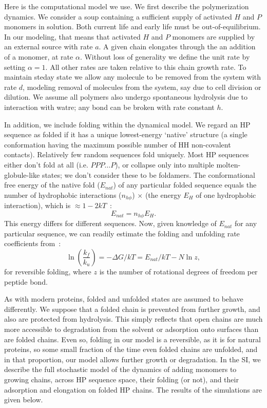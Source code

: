 \documentclass[journal=jacsat,manuscript=article,layout=twocolumn]{achemso}
\newcommand*{\ga}{\alpha}
\newcommand*{\gD}{\Delta}
\newcommand*{\pt}[1]{\left( #1\right)}
\begin{document}
 Here is the computational model we use.  We first describe the polymerization dynamics.  We 
consider a soup containing a sufficient supply of activated $H$ and $P$ monomers in solution.  Both 
current life and early life must be out-of-equilibrium.  In our modeling, that means that activated 
$H$ and $P$ monomers are supplied by an external source with rate $a$.  A given chain elongates 
through the an addition of a monomer, at rate $\ga$. Without loss of generality we define the unit 
rate by setting $\ga = 1$.  All other rates are taken relative to this chain growth rate.  To 
maintain steday state we allow any
molecule to be removed from the system with rate $d$, modeling removal of molecules from the system, 
say due to cell division or dilution.  We assume 
all polymers also undergo spontaneous hydrolysis due to interaction with watre; any bond can be 
broken with rate constant $h$.  


 In addition, we include folding within the dynamical model.  We regard an HP sequence as folded if 
it has a unique lowest-energy `native' structure (a single conformation having the maximum possible 
number of HH non-covalent contacts).  Relatively few random sequences fold uniquely.  Most HP 
sequences either don't fold at all (i.e. $PPP \ldots P$), or collapse only into multiple 
molten-globule-like states; we don't consider these to be foldamers.   
The conformational free energy of the native fold ($E_{nat}$) of any particular folded sequence 
equals 
the number of hydrophobic interactions ($n_{h\phi}$) $\times$ (the energy $E_H$ of one hydrophobic 
interaction), which is $\approx 1-2kT$~\cite{Ghosh2009}:
\begin{equation}
 E_{nat}=n_{h\phi}E_H.
\end{equation} 
This energy differs for different sequences.  Now, given knowledge of $E_{nat}$ for any particular 
sequence, we can readily estimate the folding and unfolding rate coefficients from~\cite{Ghosh2009}:
\begin{equation}
 \ln\pt{\frac{k_f}{k_u}}=-\gD G/kT = E_{nat}/kT-N\ln z,
\end{equation} 
for reversible folding, where $z$ is the number of rotational degrees of freedom per peptide bond. 
 
 As with modern proteins, folded and unfolded states are assumed to behave differently.  We suppose 
that a folded chain is prevented from further growth, and also are protected from hydrolysis.  This 
simply reflects that open chains are much more accessible to degradation from the solvent or 
adsorption onto surfaces than are folded chains.  Even so, folding in our model is a reversible, as 
it is for natural proteins, so some small fraction of the time even folded chains are unfolded, and 
in that proportion, our model allows further growth or degradation.   In the SI, we describe the 
full stochastic model of the dynamics of adding 
monomers to growing chains, across HP sequence space, their folding (or not), and their adsorption 
and elongation on folded HP chains.  The results of the simulations are given below.
 
\end{document}
